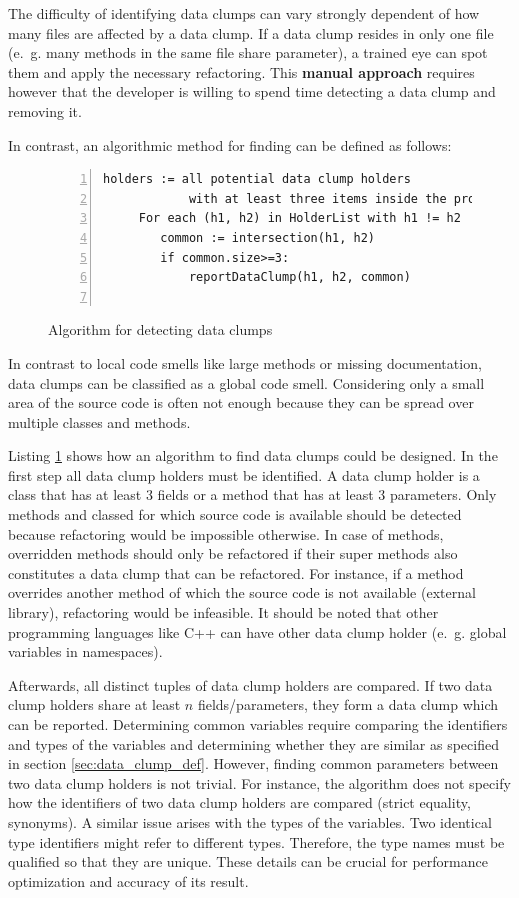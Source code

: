 The difficulty of identifying data clumps can vary strongly dependent of how many files are affected by a data clump. If a data clump resides in only one file (e.~g. many methods in the same file share parameter), a trained eye can spot them and apply the necessary refactoring. This \textbf{manual approach} requires however that the developer is willing to spend time detecting a data clump and removing it. 

In contrast, an algorithmic method for finding can be defined as follows:
\begin{figure}
\begin{lstlisting}[numbers=left]
    holders := all potential data clump holders 
            with at least three items inside the project
     For each (h1, h2) in HolderList with h1 != h2
        common := intersection(h1, h2)
        if common.size>=3:
            reportDataClump(h1, h2, common)
        

\end{lstlisting}
\caption{Algorithm for detecting data clumps}
\label{lst:data_clumps_algo}
\end{figure}

In contrast to local code smells like large methods or missing documentation, data clumps can be classified as a global code smell. Considering only a small area of the source code is often not enough because they can be spread over multiple classes and methods. 





Listing \ref{lst:data_clumps_algo} shows how an algorithm to find data clumps could be designed. In the first step all data clump holders must be identified.
A data clump holder is a class that has at least 3 fields or a method that has at least 3 parameters.  Only methods and classed for which source code is available should be detected because refactoring would be impossible otherwise. In case of methods, overridden methods should only be refactored if their super methods also constitutes a data clump that can be refactored.  For instance, if a method overrides another method of which the source code is not available (external library), refactoring would be infeasible. 
It should be noted that other programming languages like C++ can have other data clump holder (e.~g. global variables in namespaces). 


Afterwards, all distinct tuples of data clump holders are compared. If two data clump holders share at least $n$ fields/parameters, they form a data clump which can be reported. Determining common variables require comparing the identifiers and types of the variables and determining whether they are similar as specified in section \ref{sec:data_clump_def}. However, finding common parameters between two data clump holders is not trivial.  For instance, the algorithm does not specify how the identifiers of two data clump holders are compared (strict equality, synonyms). A similar issue arises with the types of the variables.  Two identical type identifiers might refer to different types. Therefore, the type names must be qualified so that they are unique. These details can be crucial for performance optimization and accuracy of its result. 



